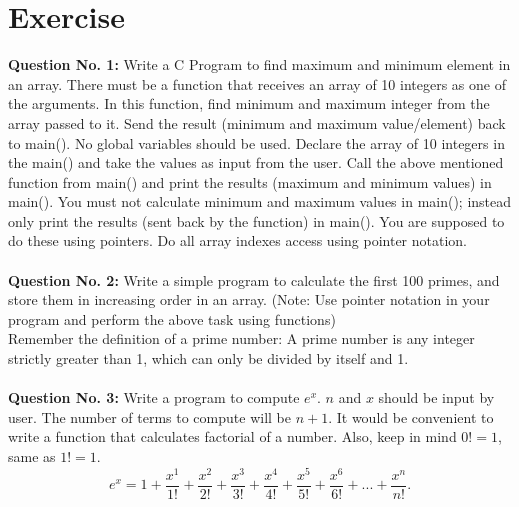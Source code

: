 \documentclass[12pt,a4paper]{article}
\begin{document}
\section{Exercise}
\textbf{Question No. 1:} Write a C Program to find maximum and minimum element in an array. There must be a function that receives an array of 10 integers as one of the arguments. In this function, find minimum and maximum integer from the array passed to it. Send the result (minimum and maximum value/element) back to main(). No global variables should be used. Declare the array of 10 integers in the main() and take the values as input from the user. Call the above mentioned function from main() and print the results (maximum and minimum values) in main(). You must not calculate minimum and maximum values in main(); instead only print the results (sent back by the function) in main(). You are supposed to do these using pointers. Do all array indexes access using pointer notation.\\
\\
\textbf{Question No. 2:} Write a simple program to calculate the first 100 primes, and store them in increasing order in an array. (Note: Use pointer notation in your program and perform the above task using functions)\\
Remember the definition of a prime number:
A prime number is any integer strictly greater than 1, which can only be divided by itself and 1.\\
\\
\textbf{Question No. 3:} Write a program to compute $e^x$. $n$ and $x$ should be input by user. The number of terms to compute will be $n+1$. It would be convenient to write a function that calculates factorial of a number. Also, keep in mind $0! = 1$, same as $1! = 1$.
\begin{equation}
e^x = 1+\dfrac{x^1}{1!}+\dfrac{x^2}{2!}+\dfrac{x^3}{3!}+\dfrac{x^4}{4!}+\dfrac{x^5}{5!}+\dfrac{x^6}{6!}+...+\dfrac{x^n}{n!}.
\label{eq:ex-Taylor-Series}
\end{equation}
\end{document}
